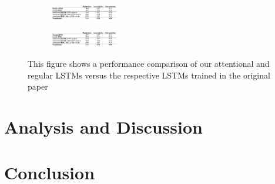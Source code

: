 \begin{figure}
\centering
\begin{subfigure}{\textwidth}
  \centering
  \includegraphics[width=3cm]{images/test_image.PNG}
  \label{fig:sub1}
\end{subfigure}%
\begin{subfigure}{\textwidth}
  \centering
  \includegraphics[width=3cm]{images/test_image.PNG}
  \label{fig:sub2}
\end{subfigure}
\caption{This figure shows a performance comparison of our attentional and regular LSTMs versus the respective LSTMs trained in the original paper}
\label{fig:test}
\end{figure}


\section{Analysis and Discussion}


\section{Conclusion}
